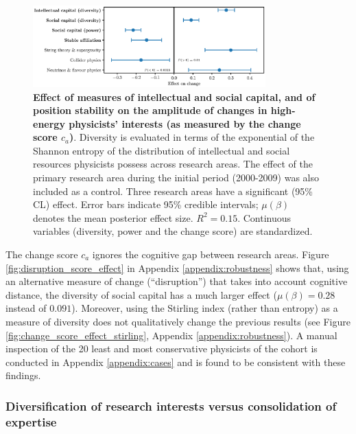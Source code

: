 \documentclass{article}
\begin{document}
\begin{figure}[h]
    \centering
    \includegraphics[width=0.8\textwidth]{plots/change_score_effects_entropy_magnitude.eps}
    \caption{\textbf{Effect of measures of intellectual and social capital, and of position stability on the amplitude of changes in high-energy physicists' interests (as measured by the change score $c_a$)}. Diversity is evaluated in terms of the exponential of the Shannon entropy of the distribution of intellectual and social resources physicists possess across research areas. The effect of the primary research area during the initial period (2000-2009) was also included as a control. Three research areas have a significant (95\% CL) effect. Error bars indicate 95\% credible intervals; $\mu(\beta)$ denotes the mean posterior effect size. $R^2=0.15$. Continuous variables (diversity, power and the change score) are standardized.}
    \label{fig:change_score_effect}
\end{figure}

The change score $c_a$ ignores the cognitive gap between research areas. Figure \ref{fig:disruption_score_effect} in Appendix \ref{appendix:robustness} shows that, using an alternative measure of change (``disruption'') that takes into account cognitive distance, the diversity of social capital has a much larger effect ($\mu(\beta)=0.28$ instead of $0.091$). Moreover, using the Stirling index (rather than entropy) as a measure of diversity does not qualitatively change the previous results (see Figure \ref{fig:change_score_effect_stirling}, Appendix \ref{appendix:robustness}). A manual inspection of the 20 least and most conservative physicists of the cohort is conducted in Appendix \ref{appendix:cases} and is found to be consistent with these findings.

\subsubsection{Diversification of research interests versus consolidation of expertise}
\end{document}
